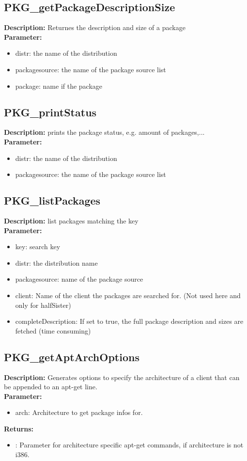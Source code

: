 \subsection{PKG\_getPackageDescriptionSize}
\textbf{Description:} Returnes the description and size of a package\\
\textbf{Parameter:}
\begin{itemize}
\item distr: the name of the distribution
\item packagesource: the name of the package source list
\item package: name if the package
\end{itemize}

\subsection{PKG\_printStatus}
\textbf{Description:} prints the package status, e.g. amount of packages,...\\
\textbf{Parameter:}
\begin{itemize}
\item distr: the name of the distribution
\item packagesource: the name of the package source list
\end{itemize}

\subsection{PKG\_listPackages}
\textbf{Description:} list packages matching the key\\
\textbf{Parameter:}
\begin{itemize}
\item key: search key
\item distr: the distribution name
\item packagesource: name of the package source
\item client: Name of the client the packages are searched for. (Not used here and only for halfSister)
\item completeDescription: If set to true, the full package description and sizes are fetched (time consuming)
\end{itemize}

\subsection{PKG\_getAptArchOptions}
\textbf{Description:} Generates options to specify the architecture of a client that can be appended to an apt-get line.\\
\textbf{Parameter:}
\begin{itemize}
\item arch: Architecture to get package infos for.
\end{itemize}
\textbf{Returns:}
\begin{itemize}
\item : Parameter for architecture specific apt-get commands, if architecture is not i386.
\end{itemize}

